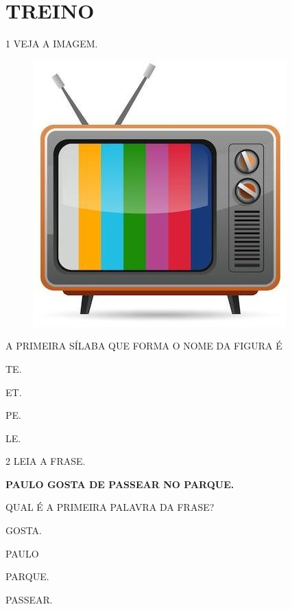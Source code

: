 \section*{TREINO}


\num{1} VEJA A IMAGEM.

\begin{figure}[H]
\centering
\includegraphics[width=.6\textwidth]{media/image123.jpg}
\end{figure}

A PRIMEIRA SÍLABA QUE FORMA O NOME DA FIGURA É

\begin{multicols}{2}
\begin{escolha}
\item TE.

\item ET.

\item PE.

\item LE.
\end{escolha}
\end{multicols}


\num{2} LEIA A FRASE.

\begin{myquote}
\textbf{PAULO GOSTA DE PASSEAR NO PARQUE.}
\end{myquote}

QUAL É A PRIMEIRA PALAVRA DA FRASE?

\begin{multicols}{2}
\begin{escolha}%
\item GOSTA.

\item PAULO

\item PARQUE.

\item PASSEAR.
\end{escolha}
\end{multicols}


